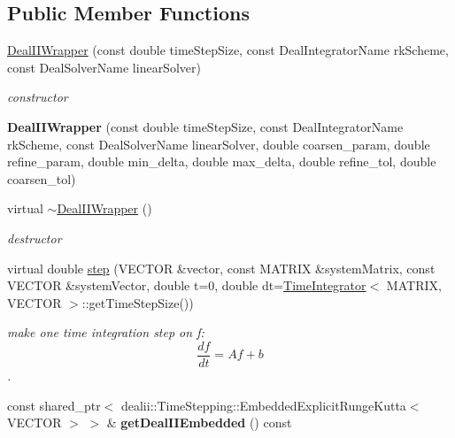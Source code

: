 \subsection*{Public Member Functions}
\begin{DoxyCompactItemize}
\item 
\hypertarget{classnatrium_1_1DealIIWrapper_a19bdd1ce28caf67d223d809d28359a02}{
\hyperlink{classnatrium_1_1DealIIWrapper_a19bdd1ce28caf67d223d809d28359a02}{DealIIWrapper} (const double timeStepSize, const DealIntegratorName rkScheme, const DealSolverName linearSolver)}
\label{classnatrium_1_1DealIIWrapper_a19bdd1ce28caf67d223d809d28359a02}

\begin{DoxyCompactList}\small\item\em constructor \item\end{DoxyCompactList}\item 
\hypertarget{classnatrium_1_1DealIIWrapper_a8f960bc0009457b1861f22273f331a01}{
{\bfseries DealIIWrapper} (const double timeStepSize, const DealIntegratorName rkScheme, const DealSolverName linearSolver, double coarsen\_\-param, double refine\_\-param, double min\_\-delta, double max\_\-delta, double refine\_\-tol, double coarsen\_\-tol)}
\label{classnatrium_1_1DealIIWrapper_a8f960bc0009457b1861f22273f331a01}

\item 
\hypertarget{classnatrium_1_1DealIIWrapper_a193b75fd9e4734d14988927c21312c8a}{
virtual \hyperlink{classnatrium_1_1DealIIWrapper_a193b75fd9e4734d14988927c21312c8a}{$\sim$DealIIWrapper} ()}
\label{classnatrium_1_1DealIIWrapper_a193b75fd9e4734d14988927c21312c8a}

\begin{DoxyCompactList}\small\item\em destructor \item\end{DoxyCompactList}\item 
virtual double \hyperlink{classnatrium_1_1DealIIWrapper_a62621205ff77a46c4f3ef01c3aefb06d}{step} (VECTOR \&vector, const MATRIX \&systemMatrix, const VECTOR \&systemVector, double t=0, double dt=\hyperlink{classnatrium_1_1TimeIntegrator}{TimeIntegrator}$<$ MATRIX, VECTOR $>$::getTimeStepSize())
\begin{DoxyCompactList}\small\item\em make one time integration step on f: \[ \frac{df}{dt} = Af+b \]. \item\end{DoxyCompactList}\item 
\hypertarget{classnatrium_1_1DealIIWrapper_ac96390fe645fb8e08b482c52f6e335b9}{
const shared\_\-ptr$<$ dealii::TimeStepping::EmbeddedExplicitRungeKutta$<$ VECTOR $>$ $>$ \& {\bfseries getDealIIEmbedded} () const }
\label{classnatrium_1_1DealIIWrapper_ac96390fe645fb8e08b482c52f6e335b9}


\end{DoxyCompactItemize}
